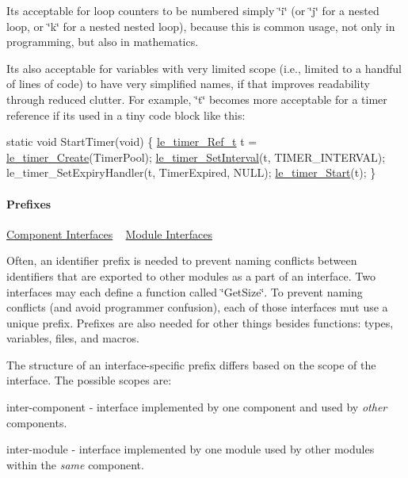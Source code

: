 It\textquotesingle{}s acceptable for loop counters to be numbered simply \char`\"{}i\char`\"{} (or \char`\"{}j\char`\"{} for a nested loop, or \char`\"{}k\char`\"{} for a nested nested loop), because this is common usage, not only in programming, but also in mathematics.

It\textquotesingle{}s also acceptable for variables with \textquotesingle{}\textquotesingle{}very\textquotesingle{}\textquotesingle{} limited scope (i.\+e., limited to a handful of lines of code) to have very simplified names, if that improves readability through reduced clutter. For example, \char`\"{}t\char`\"{} becomes more acceptable for a timer reference if it\textquotesingle{}s used in a tiny code block like this\+: 
\begin{DoxyCode}
\textcolor{keyword}{static} \textcolor{keywordtype}{void} StartTimer(\textcolor{keywordtype}{void})
\{
    \hyperlink{le__timer_8h_a763fa6992488cdce3b5a820817094838}{le\_timer\_Ref\_t} t = \hyperlink{le__timer_8h_aee41169a210378b369f440cf99146522}{le\_timer\_Create}(TimerPool);
    \hyperlink{le__timer_8h_a0a103d5cef5e83fc9088859d527bbd43}{le\_timer\_SetInterval}(t, TIMER\_INTERVAL);
    le\_timer\_SetExpiryHandler(t, TimerExpired, NULL);
    \hyperlink{le__timer_8h_ada2ce7f8cb1e76ed959e323ae94bbfc0}{le\_timer\_Start}(t);
\}
\end{DoxyCode}
\hypertarget{ccoding_stds_naming_prefix}{}\paragraph{Prefixes}\label{ccoding_stds_naming_prefix}
\hyperlink{ccoding_stds_naming_cstdsInterComponentInterfaces}{Component Interfaces} ~\newline
 \hyperlink{ccoding_stds_naming_cstdsInterModuleInterfaces}{Module Interfaces} ~\newline


Often, an identifier prefix is needed to prevent naming conflicts between identifiers that are exported to other modules as a part of an interface. Two interfaces may each define a function called \char`\"{}\+Get\+Size\char`\"{}. To prevent naming conflicts (and avoid programmer confusion), each of those interfaces mut use a unique prefix. Prefixes are also needed for other things besides functions\+: types, variables, files, and macros.

The structure of an interface-\/specific prefix differs based on the scope of the interface. The possible scopes are\+:


\begin{DoxyItemize}
\item inter-\/component -\/ interface implemented by one component and used by {\itshape other} components.
\item inter-\/module -\/ interface implemented by one module used by other modules within the {\itshape same} component.
\end{DoxyItemize}

